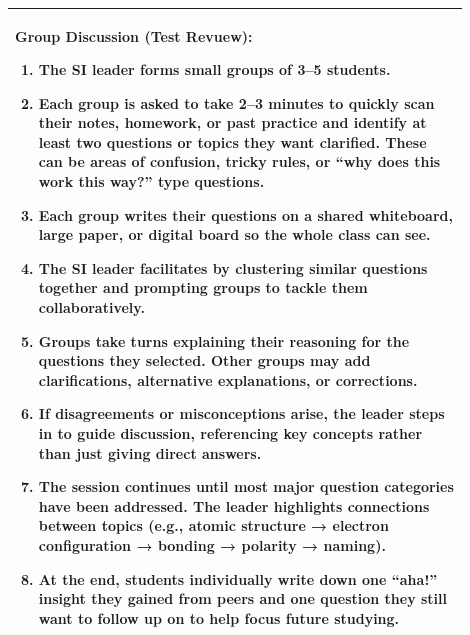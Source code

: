 \documentclass{article}
\begin{document}
\begin{tabular}{|p{0.9\linewidth}|}
\hline
\vspace{0.2cm}
\textbf{Group Discussion (Test Revuew):}
\begin{enumerate}
\item The SI leader forms small groups of 3–5 students.
\item Each group is asked to take 2–3 minutes to quickly scan their notes, homework, or past practice and identify at least two questions or topics they want clarified. These can be areas of confusion, tricky rules, or “why does this work this way?” type questions.
\item Each group writes their questions on a shared whiteboard, large paper, or digital board so the whole class can see.
\item The SI leader facilitates by clustering similar questions together and prompting groups to tackle them collaboratively.
\item Groups take turns explaining their reasoning for the questions they selected. Other groups may add clarifications, alternative explanations, or corrections.
\item If disagreements or misconceptions arise, the leader steps in to guide discussion, referencing key concepts rather than just giving direct answers.
\item The session continues until most major question categories have been addressed. The leader highlights connections between topics (e.g., atomic structure → electron configuration → bonding → polarity → naming).
\item At the end, students individually write down one “aha!” insight they gained from peers and one question they still want to follow up on to help focus future studying.
\end{enumerate} \\
\hline
\end{tabular}
\end{document}
